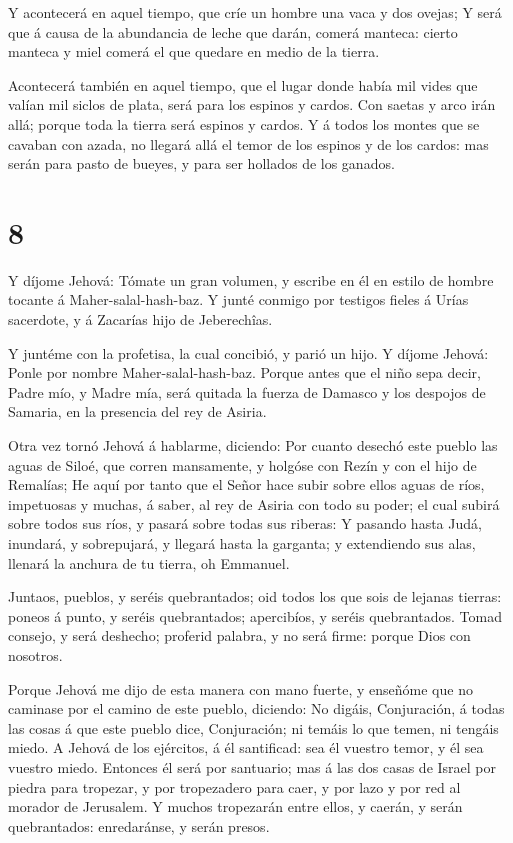 Y acontecerá en aquel tiempo, que críe un hombre una vaca
y dos ovejas;  Y será que á causa de la abundancia de leche
que darán, comerá manteca: cierto manteca y miel comerá el que quedare
en medio de la tierra.

 Acontecerá también en aquel tiempo, que el lugar donde
había mil vides que valían mil siclos de plata, será para los espinos y
cardos.  Con saetas y arco irán allá; porque toda la tierra
será espinos y cardos.  Y á todos los montes que se cavaban
con azada, no llegará allá el temor de los espinos y de los cardos: mas
serán para pasto de bueyes, y para ser hollados de los ganados.

\hypertarget{section-7}{%
\section{8}\label{section-7}}

 Y díjome Jehová: Tómate un gran volumen, y escribe en él en
estilo de hombre tocante á Maher-salal-hash-baz.  Y junté
conmigo por testigos fieles á Urías sacerdote, y á Zacarías hijo de
Jeberechîas.

 Y juntéme con la profetisa, la cual concibió, y parió un
hijo. Y díjome Jehová: Ponle por nombre Maher-salal-hash-baz.
 Porque antes que el niño sepa decir, Padre mío, y Madre
mía, será quitada la fuerza de Damasco y los despojos de Samaria, en la
presencia del rey de Asiria.

 Otra vez tornó Jehová á hablarme, diciendo: 
Por cuanto desechó este pueblo las aguas de Siloé, que corren
mansamente, y holgóse con Rezín y con el hijo de Remalías; 
He aquí por tanto que el Señor hace subir sobre ellos aguas de ríos,
impetuosas y muchas, á saber, al rey de Asiria con todo su poder; el
cual subirá sobre todos sus ríos, y pasará sobre todas sus riberas:
 Y pasando hasta Judá, inundará, y sobrepujará, y llegará
hasta la garganta; y extendiendo sus alas, llenará la anchura de tu
tierra, oh Emmanuel.

 Juntaos, pueblos, y seréis quebrantados; oid todos los que
sois de lejanas tierras: poneos á punto, y seréis quebrantados;
apercibíos, y seréis quebrantados.  Tomad consejo, y será
deshecho; proferid palabra, y no será firme: porque Dios con nosotros.

 Porque Jehová me dijo de esta manera con mano fuerte, y
enseñóme que no caminase por el camino de este pueblo, diciendo:
 No digáis, Conjuración, á todas las cosas á que este
pueblo dice, Conjuración; ni temáis lo que temen, ni tengáis miedo.
 A Jehová de los ejércitos, á él santificad: sea él vuestro
temor, y él sea vuestro miedo.  Entonces él será por
santuario; mas á las dos casas de Israel por piedra para tropezar, y por
tropezadero para caer, y por lazo y por red al morador de Jerusalem.
 Y muchos tropezarán entre ellos, y caerán, y serán
quebrantados: enredaránse, y serán presos.

